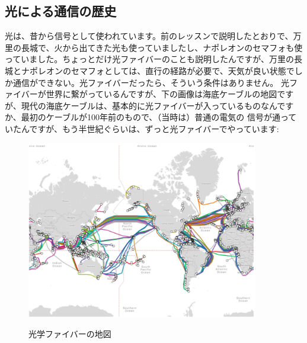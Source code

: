 \subsection{光による通信の歴史}
光は、昔から信号として使われています。前のレッスンで説明したとおりで、万里の長城で、火から出てきた光も使っていましたし、ナポレオンのセマフォも使っていました。ちょっとだけ光ファイバーのことも説明したんですが、万里の長城とナポレオンのセマフォとしては、直行の経路が必要で、天気が良い状態でしか通信ができない。光ファイバーだったら、そういう条件はありません。
光ファイバーが世界に繋がっているんですが、下の画像は海底ケーブルの地図ですが、現代の海底ケーブルは、基本的に光ファイバーが入っているものなんですか、最初のケーブルが100年前のもので、（当時は）普通の電気の
信号が通っていたんですが、もう半世紀ぐらいは、ずっと光ファイバーでやっています:
\begin{figure}[H]
    \centering
    \includegraphics[width=0.9\textwidth]{lesson5/fibre_map.pdf}
    \label{図: 1}
    \caption{光学ファイバーの地図}
\end{figure}

